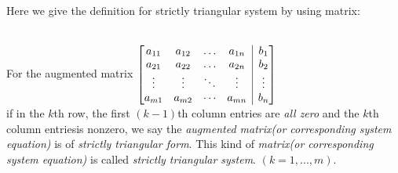 Here we give the definition for strictly triangular system by using matrix:
\begin{definition}
\qquad \\
For the augmented matrix
$\left[
\begin{array}{@{}cccc|c@{}}
a_{11} & a_{12} & \dots & a_{1n} &  b_1 \\
a_{21} & a_{22} & \dots & a_{2n} &  b_2 \\
\vdots    & \vdots    & \ddots & \vdots    & \vdots \\
a_{m1} & a_{m2} & \cdots & a_{mn} &   b_n
\end{array}
\right]$
\nopagebreak[4]
\\
if in the $k$th row, the first $(k-1)$th column entries are \textit{all zero} and the $k$th column entries\nopagebreak[4] is
\nopagebreak[4] nonzero, we say the \textit{augmented matrix(or corresponding system equation)} is of \emph{strictly triangular form}. This kind of \textit{ matrix(or corresponding system equation)} is called \emph{strictly \nopagebreak[3] triangular system}.
$(k = 1, . . . , m).$
\end{definition}

\newpage
